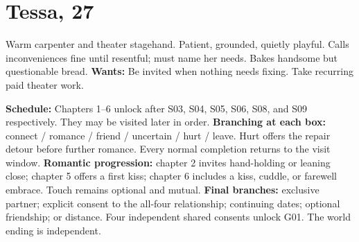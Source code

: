 \documentclass[11pt]{article}
\begin{document}
\section*{Tessa, 27}
Warm carpenter and theater stagehand. Patient, grounded, quietly playful. Calls inconveniences fine until resentful; must name her needs. Bakes handsome but questionable bread.
\medskip
\textbf{Wants:} Be invited when nothing needs fixing. Take recurring paid theater work.
\medskip
\begin{center}\end{center}
\textbf{Schedule:} Chapters 1--6 unlock after S03, S04, S05, S06, S08, and S09 respectively. They may be visited later in order.
\medskip
\textbf{Branching at each box:} connect / romance / friend / uncertain / hurt / leave. Hurt offers the repair detour before further romance. Every normal completion returns to the visit window.
\medskip
\textbf{Romantic progression:} chapter 2 invites hand-holding or leaning close; chapter 5 offers a first kiss; chapter 6 includes a kiss, cuddle, or farewell embrace. Touch remains optional and mutual.
\medskip
\textbf{Final branches:} exclusive partner; explicit consent to the all-four relationship; continuing dates; optional friendship; or distance. Four independent shared consents unlock G01. The world ending is independent.
\newpage
\end{document}
